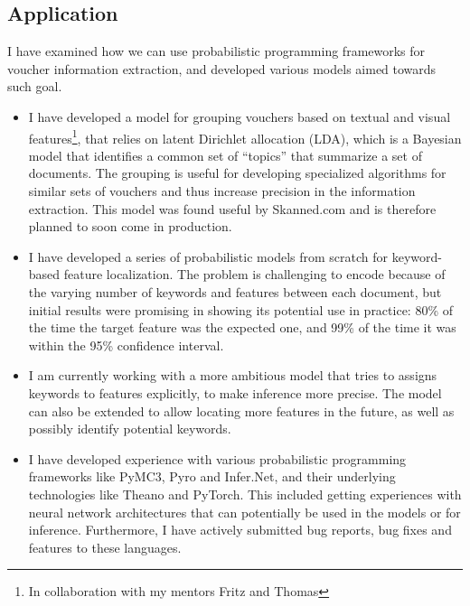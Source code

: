 \documentclass[12pt,a4paper]{article}
\begin{document}
\subsection{Application} I have examined how we can
use probabilistic programming frameworks for voucher information extraction, and
developed various models aimed towards such goal.
\begin{itemize}
\item I have developed a model for grouping vouchers based on textual and visual
  features\footnote{In collaboration with my mentors Fritz and Thomas},
  that relies on latent Dirichlet allocation (LDA), which is a Bayesian model
  that identifies a common set of ``topics'' that summarize a set of documents. The grouping is useful for developing
  specialized algorithms for similar sets of vouchers and thus increase
  precision in the information extraction. This model was found useful by
  Skanned.com and is therefore planned to soon come in production.
\item I have developed a series of probabilistic models from scratch for
  keyword-based feature localization. The problem is challenging to encode
  because of the varying number of keywords and features between each document,
  but initial results were promising in showing its potential use in practice:
  80\% of the time the target feature was the expected one, and 99\% of the time
  it was within the 95\% confidence interval.
\item I am currently working with a more ambitious model that tries to assigns
  keywords to features explicitly, to make inference more precise. The model can
  also be extended to allow locating more features in the future, as well as possibly identify potential
  keywords.
\item I have developed experience with various probabilistic programming
  frameworks like PyMC3, Pyro and Infer.Net, and their underlying technologies
  like Theano and PyTorch. This included getting experiences with neural network
  architectures that can potentially be used in the models or for inference.
  Furthermore, I have actively submitted bug reports, bug fixes and features to
  these languages.
\end{itemize}
\end{document}
